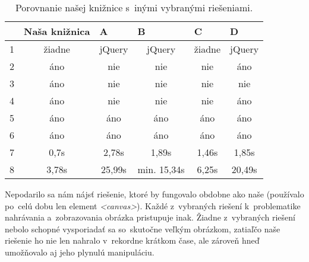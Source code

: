 \begin{table}[!htb]
	\centering
	\begin{tabular}{@{}|l|c|c|c|c|c|@{}}
	\toprule
		  		   & \multicolumn{1}{l|}{Naša knižnica} & \multicolumn{1}{l|}{A} & \multicolumn{1}{l|}{B} & \multicolumn{1}{l|}{C} & \multicolumn{1}{l|}{D} \\ \midrule
	1              & žiadne                & jQuery                 & jQuery                 & žiadne                 & jQuery                 \\ \midrule
	2 		       & áno                   & nie                    & nie                    & nie                    & áno                    \\ \midrule
	3  			   & áno                   & nie                    & nie                    & nie                    & nie                    \\ \midrule
	4			   & áno                   & nie                    & nie                    & nie                    & áno                    \\ \midrule
	5		       & áno                   & áno                    & áno                    & áno                    & áno                    \\ \midrule
	6              & áno                   & áno                    & áno                    & áno                    & áno                    \\ \midrule
	7 			   & 0,7s                  & 2,78s                  & 1,89s                  & 1,46s                  & 1,85s                  \\ \midrule
	8   		   & 3,78s                 & 25,99s                 & min. 15,34s 			 & 6,25s                  & 20,49s                 \\ \bottomrule
	\end{tabular}
	\caption{Porovnanie našej knižnice s~inými vybranými riešeniami.}
	\label{my-label}
\end{table}

Nepodarilo sa nám nájsť riešenie, ktoré by fungovalo obdobne ako naše (používalo po~celú dobu len element \emph{<canvas>}). Každé z~vybraných riešení k~problematike nahrávania a~zobrazovania obrázka pristupuje inak. Žiadne z~vybraných riešení nebolo schopné vysporiadať sa so~skutočne veľkým obrázkom, zatiaľčo naše riešenie ho nie len nahralo v~rekordne krátkom čase, ale zároveň hneď umožňovalo aj jeho plynulú manipuláciu.